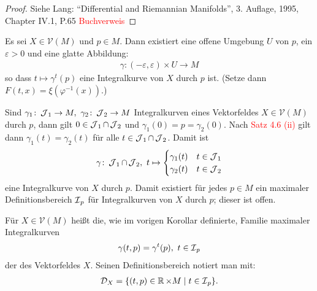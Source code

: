 \begin{proof}
  Siehe Lang: "`Differential and Riemannian Manifolds"', 3. Auflage, 1995, Chapter IV.1, P.65 \textcolor{red}{Buchverweis}
\end{proof}

\begin{kor}\label{korollar-4-7}
  Es sei $X \in \mathcal V(M)$ und $p \in M$. Dann existiert eine offene Umgebung $U$ von $p$, ein $\varepsilon > 0$ und eine glatte Abbildung:
  \begin{align*}
    \gamma\colon(-\varepsilon,\varepsilon) \times U \to M
  \end{align*}
  so dass $t \mapsto \gamma^t(p)$ eine Integralkurve von $X$ durch $p$ ist. (Setze dann $F(t,x) = \xi(\varphi^{-1}(x))$.)
\end{kor}

\begin{kor}\label{korollar-4-8}
  Sind $\gamma_1 \colon \operatorname{\mathcal{J}}_1 \to M, \ \gamma_2 \colon \operatorname{\mathcal{J}}_2 \to M$ Integralkurven eines Vektorfeldes $X \in \mathcal V(M)$ durch $p$, dann gilt $0 \in \operatorname{\mathcal{J}}_1 \cap \operatorname{\mathcal{J}}_2$ und $\gamma_1(0)= p = \gamma_2(0)$.
  Nach \textcolor{red}{Satz 4.6 (ii)} %
  gilt dann $\gamma_1(t) = \gamma_2(t)$ für alle $t \in \operatorname{\mathcal{J}}_1 \cap \operatorname{\mathcal{J}}_2$. Damit ist
  \begin{align*}
    \gamma \colon \operatorname{\mathcal{J}}_1 \cap \operatorname{\mathcal{J}}_2, \ t \mapsto 
    \begin{cases}
      \gamma_1(t) & t \in \operatorname{\mathcal{J}}_1\\
      \gamma_2(t) & t \in \operatorname{\mathcal{J}}_2
    \end{cases}
  \end{align*}
  eine Integralkurve von $X$ durch $p$.
  Damit existiert für jedes $p \in M$ ein maximaler Definitionsbereich $\operatorname{\mathcal{I}}_p$ für Integralkurven von $X$ durch $p$; dieser ist offen.
\end{kor}

\begin{dfn*}
  Für $X \in \mathcal V(M)$ heißt die, wie im vorigen Korollar definierte, Familie maximaler Integralkurven
  \begin{align*}
    \gamma(t,p) = \gamma^t(p),\ t \in \operatorname{\mathcal{I}}_p
  \end{align*}
  der  des Vektorfeldes $X$.
  Seinen Definitionsbereich notiert man mit:
  \begin{align*}
    \mathcal D_X = \{(t,p) \in \operatorname{\mathbb{R}} \times M \mid t \in \operatorname{\mathcal{I}}_p\}.
  \end{align*}
\end{dfn*}

